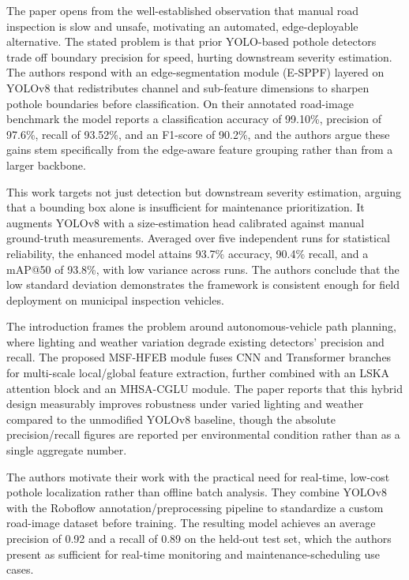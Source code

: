 \documentclass[conference]{IEEEtran}
\begin{document}
\cite{l1potyolo} The paper opens from the well-established observation that manual road inspection is slow and unsafe, motivating an automated, edge-deployable alternative. The stated problem is that prior YOLO-based pothole detectors trade off boundary precision for speed, hurting downstream severity estimation. The authors respond with an edge-segmentation module (E-SPPF) layered on YOLOv8 that redistributes channel and sub-feature dimensions to sharpen pothole boundaries before classification. On their annotated road-image benchmark the model reports a classification accuracy of 99.10\%, precision of 97.6\%, recall of 93.52\%, and an F1-score of 90.2\%, and the authors argue these gains stem specifically from the edge-aware feature grouping rather than from a larger backbone.

\cite{l2enhancedyolo} This work targets not just detection but downstream severity estimation, arguing that a bounding box alone is insufficient for maintenance prioritization. It augments YOLOv8 with a size-estimation head calibrated against manual ground-truth measurements. Averaged over five independent runs for statistical reliability, the enhanced model attains 93.7\% accuracy, 90.4\% recall, and a mAP@50 of 93.8\%, with low variance across runs. The authors conclude that the low standard deviation demonstrates the framework is consistent enough for field deployment on municipal inspection vehicles.

\cite{l3roadperception} The introduction frames the problem around autonomous-vehicle path planning, where lighting and weather variation degrade existing detectors' precision and recall. The proposed MSF-HFEB module fuses CNN and Transformer branches for multi-scale local/global feature extraction, further combined with an LSKA attention block and an MHSA-CGLU module. The paper reports that this hybrid design measurably improves robustness under varied lighting and weather compared to the unmodified YOLOv8 baseline, though the absolute precision/recall figures are reported per environmental condition rather than as a single aggregate number.

\cite{l4realtimepothole} The authors motivate their work with the practical need for real-time, low-cost pothole localization rather than offline batch analysis. They combine YOLOv8 with the Roboflow annotation/preprocessing pipeline to standardize a custom road-image dataset before training. The resulting model achieves an average precision of 0.92 and a recall of 0.89 on the held-out test set, which the authors present as sufficient for real-time monitoring and maintenance-scheduling use cases.
\end{document}
